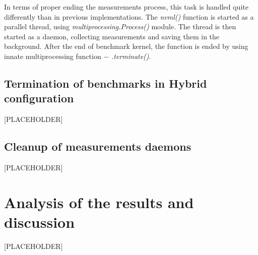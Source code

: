 In terms of proper ending the measurements process, this task is handled quite
differently than in previous implementations. The \emph{nvml\@()} function is
started as a parallel thread, using \emph{multiprocessing.Process\@()} module.
The thread is then started as a daemon, collecting measurements and saving
them in the background. After the end of benchmark kernel, the function is
ended by using innate multiprocessing function $-$ \emph{.terminate\@()}.

\newpage

\subsection{Termination of benchmarks in Hybrid configuration}


[PLACEHOLDER]

\subsection{Cleanup of measurements daemons}

[PLACEHOLDER]


\newpage

\section{Analysis of the results and discussion}



[PLACEHOLDER]
